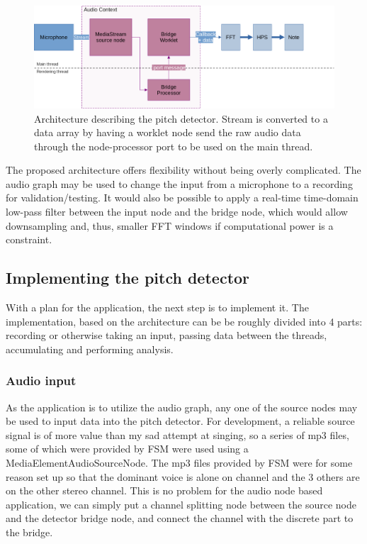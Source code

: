 \begin{figure}[ht]
    \centering
    \includegraphics[width=\textwidth]{./images/pdArchitecture.png}
    \caption{Architecture describing the pitch detector. Stream is converted to a data array by having a worklet node send the raw audio data through the node-processor port to be used on the main thread.\label{fig:pdArch}}
\end{figure}

The proposed architecture offers flexibility without being overly complicated. The audio graph may be used to change the input from a microphone to a recording for validation/testing. It would also be possible to apply a real-time time-domain low-pass filter between the input node and the bridge node, which would allow downsampling and, thus, smaller FFT windows if computational power is a constraint. 

\subsection{Implementing the pitch detector}
With a plan for the application, the next step is to implement it. The implementation, based on the architecture can be be roughly divided into 4 parts: recording or otherwise taking an input, passing data between the threads, accumulating and performing analysis.

\subsubsection{Audio input}
As the application is to utilize the audio graph, any one of the source nodes may be used to input data into the pitch detector. For development, a reliable source signal is of more value than my sad attempt at singing, so a series of mp3 files, some of which were provided by FSM were used using a MediaElementAudioSourceNode. The mp3 files provided by FSM were for some reason set up so that the dominant voice is alone on channel and the 3 others are on the other stereo channel. This is no problem for the audio node based application, we can simply put a channel splitting node between the source node and the detector bridge node, and connect the channel with the discrete part to the bridge.


